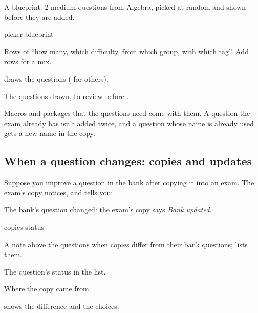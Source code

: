 \documentclass[11pt]{article}
\begin{document}
\begin{keep}
\begin{guidefig}{A blueprint: 2 medium questions from Algebra, picked at random and shown before they are added.}
\begin{shot}{picker-blueprint}
\end{shot}
\end{guidefig}
\begin{callouts}
  \item Rows of ``how many, which difficulty, from which group, with which tag''. Add rows for a mix.
  \item {} draws the questions ( for others).
  \item The questions drawn, to review before .
\end{callouts}
\end{keep}

\begin{tip}
Macros and packages that the questions need come with them. A question the exam already has isn't added twice, and a question whose name is already used gets a new name in the copy.
\end{tip}

\subsection{When a question changes: copies and updates}\label{sec:bank-copies}

Suppose you improve a question in the bank after copying it into an exam. The exam's copy notices, and tells you:

\begin{keep}
\begin{guidefig}{The bank's question changed: the exam's copy says \emph{Bank updated}.}
\begin{shot}[0.72\linewidth]{copies-status}
\end{shot}
\end{guidefig}
\begin{callouts}
  \item A note above the questions when copies differ from their bank questions;  lists them.
  \item The question's status in the list.
  \item Where the copy came from.
  \item {} shows the difference and the choices.
\end{callouts}
\end{keep}
\end{document}
